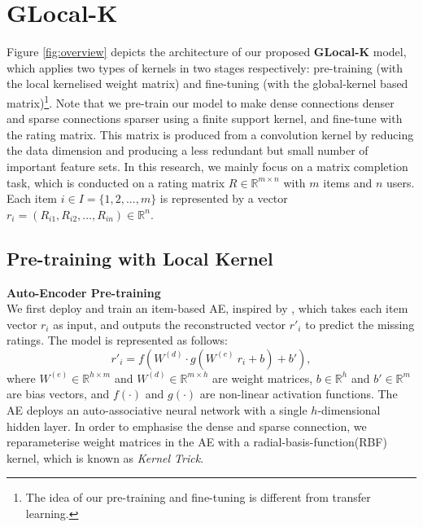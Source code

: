 \documentclass[sigconf]{acmart}
\begin{document}
\section{GLocal-K}
Figure \ref{fig:overview} depicts the architecture of our proposed \textbf{GLocal-K} model, which applies two types of kernels in two stages respectively: pre-training (with the local kernelised weight matrix) and fine-tuning (with the global-kernel based matrix)\footnote{The idea of our pre-training and fine-tuning is different from transfer learning.}. Note that we pre-train our model to make dense connections denser and sparse connections sparser using a finite support kernel, and fine-tune with the rating matrix. This matrix is produced from a convolution kernel by reducing the data dimension and producing a less redundant but small number of important feature sets. In this research, we mainly focus on a matrix completion task, which is conducted on a rating matrix $R \in \mathbb{R}^{m \times n}$ with $m$ items and $n$ users. Each item $i \in I =\{1, 2, ..., m\}$ is represented by a vector $r_i = (R_{i1}, R_{i2}, ..., R_{in}) \in \mathbb{R}^{n}$. 
\setlength{\belowdisplayskip}{5pt}
\setlength{\abovedisplayskip}{5pt}

\subsection{Pre-training with Local Kernel}
\textbf{Auto-Encoder Pre-training}\\
We first deploy and train an item-based AE, inspired by \cite{sedhain2015autorec}, which takes each item vector $r_i$ as input, and outputs the reconstructed vector ${r}'_i$ to predict the missing ratings. The model is represented as follows:
\setlength{\belowdisplayskip}{4pt}
\setlength{\abovedisplayskip}{4pt}
\begin{equation}
\label{auto_encoder}
{r}'_{i}=f(W^{(d)}\cdot g(W^{(e)} \ r_{i}+b)+{b}'),
\end{equation}
where $W^{(e)} \in \mathbb{R}^{h \times m}$ and $W^{(d)} \in \mathbb{R}^{m \times h}$ are weight matrices, $b \in \mathbb{R}^{h}$ and ${b}' \in \mathbb{R}^{m}$ are bias vectors, and $f(\cdot)$ and $g(\cdot)$ are non-linear activation functions. The AE deploys an auto-associative neural network with a single $h$-dimensional hidden layer. In order to emphasise the dense and sparse connection, we reparameterise weight matrices in the AE with a radial-basis-function(RBF) kernel, which is known as \textit{Kernel Trick}\cite{giannakopoulos2008novel}.
\end{document}
